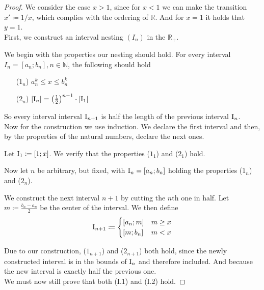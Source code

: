 \documentclass[a4paper, 10pt]{article}
\theoremstyle{remark}
\theoremstyle{definition}
\begin{document}
    \begin{proof}
    We consider the case \(x > 1\), since for \(x < 1\) we can make the transition \(x' \coloneqq 1/x\), which complies with the ordering of \(\mathbb{R}\). And for \(x = 1\) it holds that \(y = 1\).\\

    First, we construct an interval nesting \((I_n)\) in the \(\mathbb{R}_+\).
    
    We begin with the properties our nesting should hold. For every interval \(I_n = [a_n; b_n], n \in \mathbb{N}\), the following should hold

    \begin{itemize}[label={}]
        \item[(\(1_n\))] \(a_n^k \leq x \leq b_n^k\)
        
        \item[(\(2_n\))] \(|\text{I}_n| = \left(\frac{1}{2}\right)^{n-1}\cdot|\text{I}_1|\)
    \end{itemize}

    So every interval interval \(\text{I}_{n + 1}\) is half the length of the previous interval \(\text{I}_n\).\\

    Now for the construction we use induction. We declare the first interval and then, by the properties of the natural numbers, declare the next ones.

    Let \(\text{I}_1 \coloneqq [1; x]\). We verify that the properties (\(1_1\)) and (\(2_1\)) hold.
    
    Now let \(n\) be arbitrary, but fixed, with \(\text{I}_n = [a_n; b_n]\) holding the properties (\(1_n\)) and (\(2_n\)).
    
    We construct the next interval \(n + 1\) by cutting the \(n\)th one in half. Let \(m \coloneqq \frac{b_n - a_n}{2}\) be the center of the interval. We then define
    \[
        \text{I}_{n+1} \coloneqq \begin{cases}
            [a_n; m] & m \geq x\\
            [m; b_n] & m < x
        \end{cases}
    \]

    Due to our construction, (\(1_{n+1}\)) and (\(2_{n+1}\)) both hold, since the newly constructed interval is in the bounds of \(\text{I}_n\) and therefore included. And because the new interval is exactly half the previous one.\\

    We must now still prove that both (I.1) and (I.2) hold.


\end{proof}
\end{document}
